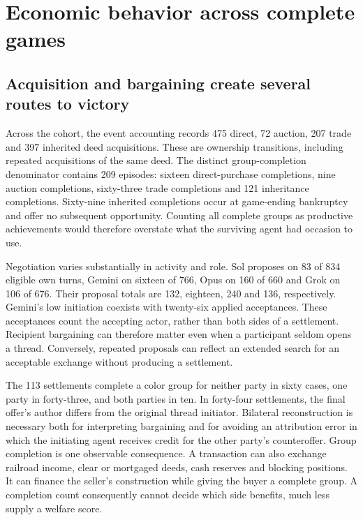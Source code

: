 \section{Economic behavior across complete games}
\label{sec:sol-economic-results}

\subsection{Acquisition and bargaining create several routes to victory}

Across the cohort, the event accounting records 475 direct, 72 auction, 207 trade and 397 inherited deed acquisitions. These are ownership transitions, including repeated acquisitions of the same deed. The distinct group-completion denominator contains 209 episodes: sixteen direct-purchase completions, nine auction completions, sixty-three trade completions and 121 inheritance completions. Sixty-nine inherited completions occur at game-ending bankruptcy and offer no subsequent opportunity. Counting all complete groups as productive achievements would therefore overstate what the surviving agent had occasion to use.

Negotiation varies substantially in activity and role. Sol proposes on 83 of 834 eligible own turns, Gemini on sixteen of 766, Opus on 160 of 660 and Grok on 106 of 676. Their proposal totals are 132, eighteen, 240 and 136, respectively. Gemini's low initiation coexists with twenty-six applied acceptances. These acceptances count the accepting actor, rather than both sides of a settlement. Recipient bargaining can therefore matter even when a participant seldom opens a thread. Conversely, repeated proposals can reflect an extended search for an acceptable exchange without producing a settlement.

The 113 settlements complete a color group for neither party in sixty cases, one party in forty-three, and both parties in ten. In forty-four settlements, the final offer's author differs from the original thread initiator. Bilateral reconstruction is necessary both for interpreting bargaining and for avoiding an attribution error in which the initiating agent receives credit for the other party's counteroffer. Group completion is one observable consequence. A transaction can also exchange railroad income, clear or mortgaged deeds, cash reserves and blocking positions. It can finance the seller's construction while giving the buyer a complete group. A completion count consequently cannot decide which side benefits, much less supply a welfare score.

